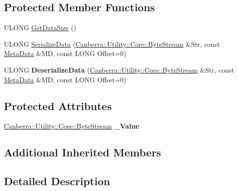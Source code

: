 \subsection*{Protected Member Functions}
\begin{DoxyCompactItemize}
\item 
U\+L\+O\+NG \hyperlink{class_canberra_1_1_serialization_1_1_blob_af97e0642f5b289dc263650ce6dba478f_af97e0642f5b289dc263650ce6dba478f}{Get\+Data\+Size} ()
\item 
U\+L\+O\+NG \hyperlink{class_canberra_1_1_serialization_1_1_blob_a3ff71c78800fdabcddcff34642efbe1f_a3ff71c78800fdabcddcff34642efbe1f}{Serialize\+Data} (\hyperlink{class_canberra_1_1_utility_1_1_core_1_1_byte_stream}{Canberra\+::\+Utility\+::\+Core\+::\+Byte\+Stream} \&Str, const \hyperlink{class_canberra_1_1_serialization_1_1_meta_data}{Meta\+Data} \&MD, const L\+O\+NG Offset=0)
\item 
\mbox{\label{class_canberra_1_1_serialization_1_1_blob_aa7d35720c9c5845458d37b8298e985f4}} 
U\+L\+O\+NG {\bfseries Deserialize\+Data} (\hyperlink{class_canberra_1_1_utility_1_1_core_1_1_byte_stream}{Canberra\+::\+Utility\+::\+Core\+::\+Byte\+Stream} \&Str, const \hyperlink{class_canberra_1_1_serialization_1_1_meta_data}{Meta\+Data} \&MD, const L\+O\+NG Offset=0)
\end{DoxyCompactItemize}
\subsection*{Protected Attributes}
\begin{DoxyCompactItemize}
\item 
\mbox{\label{class_canberra_1_1_serialization_1_1_blob_a084a56335012e21c786ea32ee369576c}} 
\hyperlink{class_canberra_1_1_utility_1_1_core_1_1_byte_stream}{Canberra\+::\+Utility\+::\+Core\+::\+Byte\+Stream} {\bfseries \+\_\+\+Value}
\end{DoxyCompactItemize}
\subsection*{Additional Inherited Members}


\subsection{Detailed Description}


